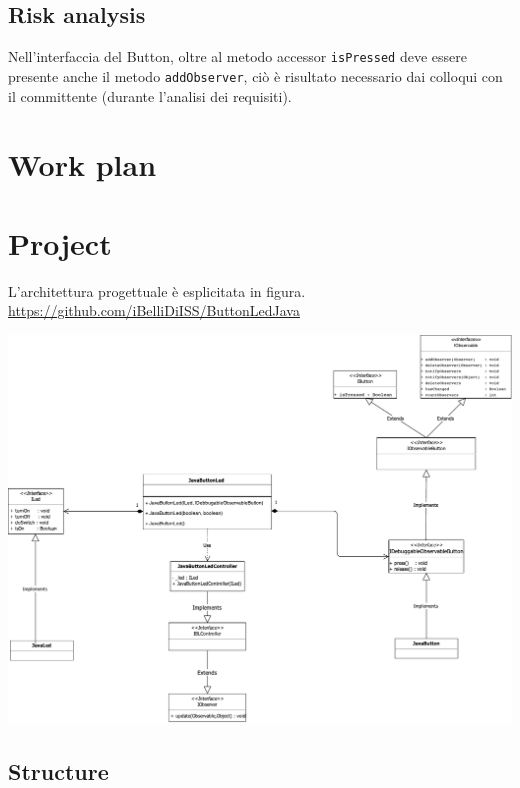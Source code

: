 \documentclass{llncs}
\newcommand{\labelsec}[1]{\label{sec:#1}}
\begin{document}
\subsection{Risk analysis}
Nell'interfaccia del Button, oltre al metodo accessor \texttt{isPressed} deve essere presente anche il metodo \texttt{addObserver}, ci\`o \`e risultato necessario dai colloqui con il committente (durante l'analisi dei requisiti).
\section{Work plan}
\labelsec{wplan}

\section{Project}
\labelsec{Project}
L'architettura progettuale \`e esplicitata in figura.\\
\url{https://github.com/iBelliDiISS/ButtonLedJava}
\begin{center}
\includegraphics[scale=0.6]{img/graphs/Progettazione_BLS.pdf}
\end{center}

\subsection{Structure}
\end{document}
